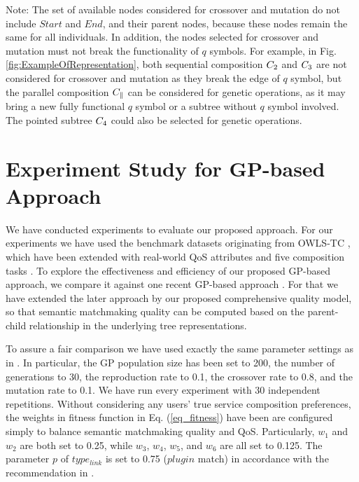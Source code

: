 Note: The set of available nodes considered for crossover  and mutation do not include $Start$ and $End$, and their parent nodes, because these nodes remain the same for all individuals.  In addition, the nodes selected for crossover and mutation must not break the functionality of $q$ symbols. For example, in Fig. \ref{fig:ExampleOfRepresentation}, both sequential composition $C_2$ and $C_3 $ are not considered for crossover and mutation as they break the edge of $q$ symbol, but the parallel composition $C_{\parallel}$ can be considered for genetic operations, as it may bring a new fully functional $q$ symbol or a subtree without $q$ symbol involved. The pointed subtree $C_4$ could also be selected for genetic operations. 
\section{Experiment Study for GP-based Approach}\label{experiment_study}

We have conducted experiments to evaluate our proposed approach. 
For our experiments we have used the benchmark datasets originating from OWLS-TC \cite{kuster2008opossum} , which have been extended with real-world QoS attributes and five composition tasks \cite{ma2015hybrid}. To explore the effectiveness and efficiency of our proposed GP-based approach, we compare it against one recent GP-based approach \cite{ma2015hybrid}. For that we have extended the later approach by our proposed comprehensive quality model, so that semantic matchmaking quality can be computed based on the parent-child relationship in the underlying tree representations. 


To assure a fair comparison we have used exactly the same parameter settings as in \cite{ma2015hybrid}. In particular, the GP population size has been set to 200, the number of generations to 30, the reproduction rate to 0.1, the crossover rate to 0.8, and the mutation rate to 0.1. We have run every experiment with 30 independent repetitions. Without considering any users' true service composition preferences, the weights in fitness function in Eq. (\ref{eq_fitness}) have been are configured simply to balance semantic matchmaking quality and QoS. Particularly, $w_{1}$ and $w_{2}$ are both set to 0.25, while $w_{3}$, $w_{4}$, $w_{5}$, and $w_{6}$ are all set to 0.125. The parameter $p$ of $type_{link}$ is set to 0.75 ($plugin$ match) in accordance with the recommendation in \cite{lecue2009optimizing}. 

